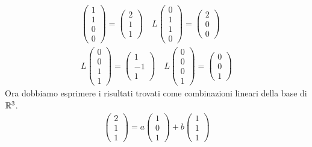 \begin{example}
\begin{align*}
\begin{pmatrix}
			  1 \\ 1 \\ 0 \\ 0
		  \end{pmatrix} =
		\begin{pmatrix}
			2 \\ 1 \\ 1
		\end{pmatrix} \quad
		L \begin{pmatrix}
			  0 \\ 1 \\ 1 \\ 0
		  \end{pmatrix} =
		\begin{pmatrix}
			2 \\ 0 \\ 0
		\end{pmatrix} \\
		L \begin{pmatrix}
			  0 \\ 0 \\ 1 \\ 1
		  \end{pmatrix} =
		\begin{pmatrix}
			1 \\ -1 \\ 1
		\end{pmatrix} \quad
		L \begin{pmatrix}
			  0 \\ 0 \\ 0 \\ 1
		  \end{pmatrix} =
		\begin{pmatrix}
			0 \\ 0 \\ 1
		\end{pmatrix}
	\end{align*}
	Ora dobbiamo esprimere i risultati trovati come combinazioni lineari della base di
	$\mathbb{R}^3$.
	\begin{gather*}
		\begin{pmatrix}
			2 \\ 1 \\ 1
		\end{pmatrix} =
		a \begin{pmatrix}
			1 \\ 0 \\ 1
		\end{pmatrix} +
		b \begin{pmatrix}
			1 \\ 1 \\ 1

\end{pmatrix}
\end{gather*}
\end{example}
